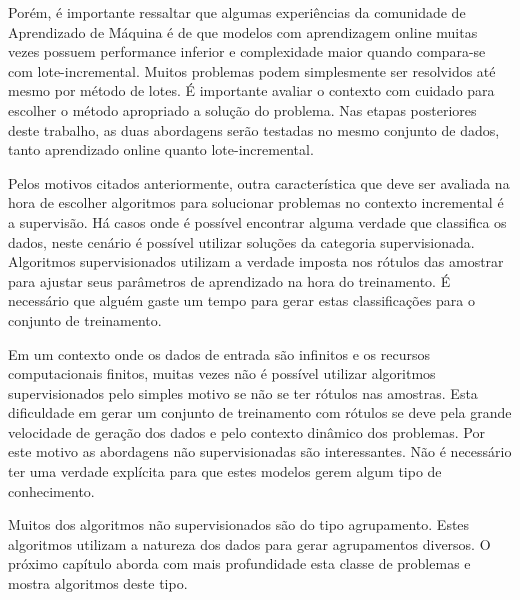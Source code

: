 Porém, é importante ressaltar que algumas experiências da comunidade de Aprendizado de Máquina é de que modelos com aprendizagem online muitas vezes possuem performance inferior e complexidade maior quando compara-se com lote-incremental. Muitos problemas podem simplesmente ser resolvidos até mesmo por método de lotes. É importante avaliar o contexto com cuidado para escolher o método apropriado a solução do problema. Nas etapas posteriores deste trabalho, as duas abordagens serão testadas no mesmo conjunto de dados, tanto aprendizado online quanto lote-incremental.

Pelos motivos citados anteriormente, outra característica que deve ser avaliada na hora de escolher algoritmos para solucionar problemas no contexto incremental é a supervisão. Há casos onde é possível encontrar alguma verdade que classifica os dados, neste cenário é possível utilizar soluções da categoria supervisionada. Algoritmos supervisionados utilizam a verdade imposta nos rótulos das amostrar para ajustar seus parâmetros de aprendizado na hora do treinamento. É necessário que alguém gaste um tempo para gerar estas classificações para o conjunto de treinamento.

Em um contexto onde os dados de entrada são infinitos e os recursos computacionais finitos, muitas vezes não é possível utilizar algoritmos supervisionados pelo simples motivo se não se ter rótulos nas amostras. Esta dificuldade em gerar um conjunto de treinamento com rótulos se deve pela grande velocidade de geração dos dados e pelo contexto dinâmico dos problemas. Por este motivo as abordagens não supervisionadas são interessantes. Não é necessário ter uma verdade explícita para que estes modelos gerem algum tipo de conhecimento.

Muitos dos algoritmos não supervisionados são do tipo agrupamento. Estes algoritmos utilizam a natureza dos dados para gerar agrupamentos diversos. O próximo capítulo aborda com mais profundidade esta classe de problemas e mostra algoritmos deste tipo.  




 


